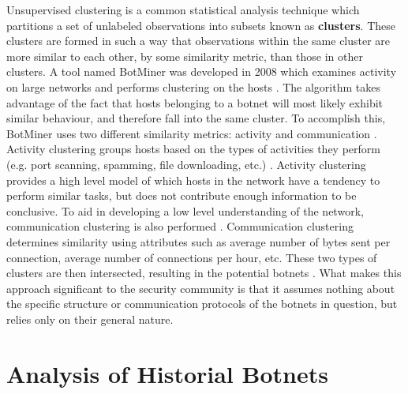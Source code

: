 Unsupervised clustering is a common statistical analysis technique which partitions a set of unlabeled
observations into subsets known as \textbf{clusters}.  These clusters are formed in
such a way that observations within the
same cluster are more similar to each other, by some similarity metric, than
those in other clusters. A tool named BotMiner was developed in 2008 which examines
activity on large networks and performs clustering on the hosts \cite{clustering}.
The algorithm takes advantage of the fact that hosts belonging to a botnet will most
likely exhibit similar behaviour, and therefore fall into the same cluster.
To accomplish this, BotMiner uses two different similarity metrics: activity and
communication \cite{clustering}.  Activity clustering groups hosts based on the
types of activities they perform (e.g. port scanning, spamming, file downloading,
etc.) \cite{clustering}.  Activity clustering provides a high level model of which
hosts in the network have a tendency to perform similar tasks, but does not contribute enough
information to be conclusive.  To aid in developing a low level understanding
of the network, communication clustering is also performed \cite{clustering}.
Communication clustering determines similarity using attributes such as average
number of bytes sent per connection, average number of connections per hour, etc.
These two types of clusters are then intersected, resulting in the potential
botnets \cite{clustering}.  What makes this approach significant to the security community
is that it assumes nothing about the specific structure or communication protocols of
the botnets in question, but relies only on their general nature.

\section{Analysis of Historial Botnets}

